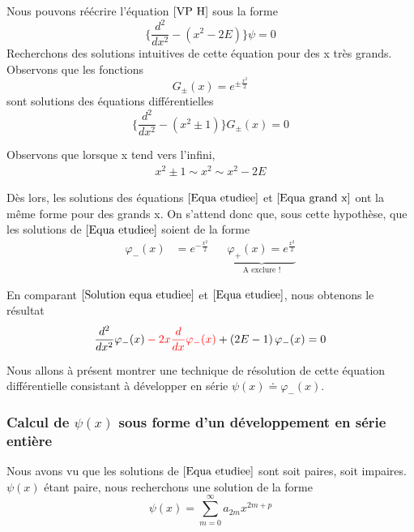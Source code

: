 \documentclass[../Notesdecours.tex]{subfiles}
\begin{document}
Nous pouvons réécrire l'équation $\eqref{VP H}$ sous la forme
\begin{equation}
    \label{Equa etudiee}
    \big\{\frac{d^2}{dx^2}-\left(x^2-2E\right)\big\}\psi = 0
\end{equation}
Recherchons des solutions intuitives de cette équation pour des x très grands. Observons que les fonctions
\begin{equation}
    G_{\pm}(x) = e^{\pm \frac{x^2}{2}}
\end{equation}
sont solutions des équations différentielles
\begin{equation}
    \big\{\frac{d^2}{dx^2}-(x^2\pm 1)\big\}G_{\pm}(x) = 0
    \label{Equa grand x}
\end{equation}
\begin{remark}
    Observons que lorsque x tend vers l'infini,
    \begin{align*}
        x^2\pm 1 \sim x^2 \sim x^2-2E
    \end{align*}
\end{remark}

Dès lors, les solutions des équations $\eqref{Equa etudiee}$ et $\eqref{Equa grand x}$ ont la même forme pour des grands x. On s'attend donc que, sous cette hypothèse, que les solutions de $\eqref{Equa etudiee}$ soient de la forme
\begin{align}
    \label{Solution equa etudiee}
    \varphi_-(x) &= e^{-\frac{x^2}{2}} & &\underbrace{\varphi_+(x) = e^{\frac{x^2}{2}}}_{\text{A exclure !}}
\end{align}

En comparant $\eqref{Solution equa etudiee}$ et $\eqref{Equa etudiee}$, nous obtenons le résultat
\begin{equation}
    \label{solution}
    \frac{d^2}{dx^2}\varphi_-(x) \color{red}- 2x\frac{d}{dx}\varphi_-(x) \color{black} + \left(2E-1\right)\varphi_-(x) = 0
\end{equation}

Nous allons à présent montrer une technique de résolution de cette équation différentielle consistant à développer en série $\psi(x) \doteq \varphi_-(x)$.

\subsubsection{Calcul de $\psi(x)$ sous forme d'un développement en série entière}

Nous avons vu que les solutions de $\eqref{Equa etudiee}$ sont soit paires, soit impaires. $\psi (x)$ étant paire, nous recherchons une solution de la forme
\begin{equation}
    \psi(x) = \sum_{m = 0}^\infty a_{2m}x^{2m+p}
\end{equation}
\end{document}
